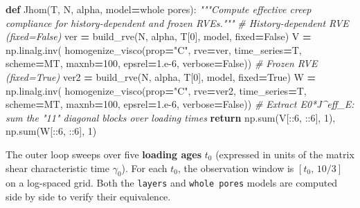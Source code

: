 \documentclass[
  a4paper,
  numbers=noendperiod,
  DIV=12]{scrreprt}
\newenvironment{Shaded}{\begin{snugshade}}{\end{snugshade}}
\newcommand{\BuiltInTok}[1]{#1}
\newcommand{\CommentTok}[1]{\textcolor[rgb]{0.56,0.35,0.01}{\textit{#1}}}
\newcommand{\ControlFlowTok}[1]{\textcolor[rgb]{0.13,0.29,0.53}{\textbf{#1}}}
\newcommand{\DecValTok}[1]{\textcolor[rgb]{0.00,0.00,0.81}{#1}}
\newcommand{\FloatTok}[1]{\textcolor[rgb]{0.00,0.00,0.81}{#1}}
\newcommand{\KeywordTok}[1]{\textcolor[rgb]{0.13,0.29,0.53}{\textbf{#1}}}
\newcommand{\NormalTok}[1]{#1}
\newcommand{\OperatorTok}[1]{\textcolor[rgb]{0.81,0.36,0.00}{\textbf{#1}}}
\newcommand{\StringTok}[1]{\textcolor[rgb]{0.31,0.60,0.02}{#1}}
\newcommand{\VariableTok}[1]{\textcolor[rgb]{0.00,0.00,0.00}{#1}}
\begin{document}
\begin{Shaded}
\begin{Highlighting}[]
\KeywordTok{def}\NormalTok{ Jhom(T, N, alpha, model}\OperatorTok{=}\StringTok{\textquotesingle{}whole pores\textquotesingle{}}\NormalTok{):}
    \CommentTok{"""Compute effective creep compliance for history{-}dependent and frozen RVEs."""}
    \CommentTok{\# History{-}dependent RVE (fixed=False)}
\NormalTok{    ver  }\OperatorTok{=}\NormalTok{ build\_rve(N, alpha, T[}\DecValTok{0}\NormalTok{], model, fixed}\OperatorTok{=}\VariableTok{False}\NormalTok{)}
\NormalTok{    V }\OperatorTok{=}\NormalTok{ np.linalg.inv(}
\NormalTok{        homogenize\_visco(prop}\OperatorTok{=}\StringTok{"C"}\NormalTok{, rve}\OperatorTok{=}\NormalTok{ver, time\_series}\OperatorTok{=}\NormalTok{T,}
\NormalTok{                         scheme}\OperatorTok{=}\NormalTok{MT, maxnb}\OperatorTok{=}\DecValTok{100}\NormalTok{, epsrel}\OperatorTok{=}\FloatTok{1.e{-}6}\NormalTok{, verbose}\OperatorTok{=}\VariableTok{False}\NormalTok{))}
    \CommentTok{\# Frozen RVE (fixed=True)}
\NormalTok{    ver2 }\OperatorTok{=}\NormalTok{ build\_rve(N, alpha, T[}\DecValTok{0}\NormalTok{], model, fixed}\OperatorTok{=}\VariableTok{True}\NormalTok{)}
\NormalTok{    W }\OperatorTok{=}\NormalTok{ np.linalg.inv(}
\NormalTok{        homogenize\_visco(prop}\OperatorTok{=}\StringTok{"C"}\NormalTok{, rve}\OperatorTok{=}\NormalTok{ver2, time\_series}\OperatorTok{=}\NormalTok{T,}
\NormalTok{                         scheme}\OperatorTok{=}\NormalTok{MT, maxnb}\OperatorTok{=}\DecValTok{100}\NormalTok{, epsrel}\OperatorTok{=}\FloatTok{1.e{-}6}\NormalTok{, verbose}\OperatorTok{=}\VariableTok{False}\NormalTok{))}
    \CommentTok{\# Extract E0*J\^{}eff\_E: sum the "11" diagonal blocks over loading times}
    \ControlFlowTok{return}\NormalTok{ np.}\BuiltInTok{sum}\NormalTok{(V[::}\DecValTok{6}\NormalTok{, ::}\DecValTok{6}\NormalTok{], }\DecValTok{1}\NormalTok{), np.}\BuiltInTok{sum}\NormalTok{(W[::}\DecValTok{6}\NormalTok{, ::}\DecValTok{6}\NormalTok{], }\DecValTok{1}\NormalTok{)}
\end{Highlighting}
\end{Shaded}

The outer loop sweeps over five \textbf{loading ages} \(t_0\) (expressed
in units of the matrix shear characteristic time \(\gamma_0\)). For each
\(t_0\), the observation window is \([t_0,\, 10/3]\) on a log-spaced
grid. Both the \texttt{\textquotesingle{}layers\textquotesingle{}} and
\texttt{\textquotesingle{}whole\ pores\textquotesingle{}} models are
computed side by side to verify their equivalence.
\end{document}
